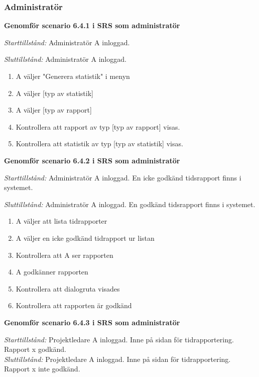 \documentclass[a4paper]{article}
\begin{document}
\subsubsection{Administratör}

\begin{ST}

\item
\textbf{Genomför scenario 6.4.1 i SRS som administratör}

\emph{Starttillstånd:} Administratör A inloggad.

\emph{Sluttillstånd:} Administratör A inloggad.

\begin{enumerate}
\item
A väljer "Generera statistik" i menyn
\item
A väljer [typ av statistik]
\item 
A väljer [typ av rapport]
\item
Kontrollera att rapport av typ [typ av rapport] visas.
\item
Kontrollera att statistik av typ [typ av statistik] visas.
\end{enumerate}

\item
\textbf{Genomför scenario 6.4.2 i SRS som administratör}

\emph{Starttillstånd:} Administratör A inloggad. En icke godkänd tidsrapport finns i systemet.

\emph{Sluttillstånd:} Administratör A inloggad. En godkänd tidsrapport finns i systemet.

\begin{enumerate}

\item
A väljer att lista tidrapporter
\item
A väljer en icke godkänd tidrapport ur listan
\item
Kontrollera att A ser rapporten
\item
A godkänner rapporten
\item
Kontrollera att dialogruta visades
\item
Kontrollera att rapporten är godkänd

\end{enumerate}

\item
\textbf{Genomför scenario 6.4.3 i SRS som administratör}

\emph{Starttillstånd:} Projektledare A inloggad. Inne på sidan för tidrapportering. Rapport x godkänd.\\
\emph{Sluttillstånd:} Projektledare A inloggad. Inne på sidan för tidrapportering. Rapport x inte godkänd.\\



\end{ST}
\end{document}

